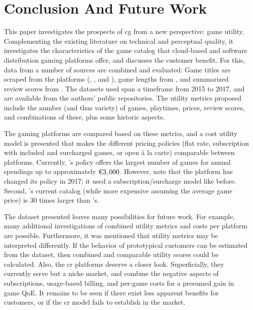 \section{Conclusion And Future Work}
\label{sec:conclusion}


This paper investigates the prospects of \gls{cg} from a new
perspective: game utility. Complementing the existing literature
on technical and perceptual quality, it
investigates the characteristics of the game catalog
that cloud-based and software distribution gaming
platforms offer, and discusses the customer benefit.
For this, data from a number of sources are combined and evaluated:
Game titles are scraped from the platforms (\gfnow, \psnow, and \steam),
game lengths from \hltb, and summarized review scores from
\metacritic.
The datasets used span a timeframe from 2015 to 2017, and are
available from the authors' public repositories.
The utility metrics proposed include the number (and thus variety)
of games, playtimes, prices, review scores, and combinations of these,
plus some historic aspects.

The gaming platforms are compared based on these metrics, and a
cost utility model is presented that makes the different pricing
policies (flat rate, subscription with included and surcharged
games, or open à la carte) comparable between platforms.
Currently, \psnow's policy offers the largest number of games
for annual spendings up to approximately $\text{\texteuro} 3,000$. However,
note that the platform has changed its policy
in 2017; it used a subscription/surcharge model like \gfnow
before. Second, \steam's current catalog (while more expensive
assuming the average game price) is 30 times larger than
\psnow's.

The dataset presented leaves many possibilities
for future work. For example, many additional investigations of
combined utility metrics and costs per platform are possible.
Furthermore, it was mentioned that utility metrics may be
interpreted differently. If the behavior of prototypical customers
can be estimated from the dataset, then combined and comparable
utility scores could be calculated.
Also, the \gls{cr} platforms deserve a closer look. Superficially,
they currently serve but a niche market, and combine the negative
aspects of subscriptions, usage-based billing, and per-game costs
for a presumed gain in game \gls{QoE}. It remains to be seen
if there exist less apparent benefits for customers, or if the
\gls{cr} model fails to establish in the market.

